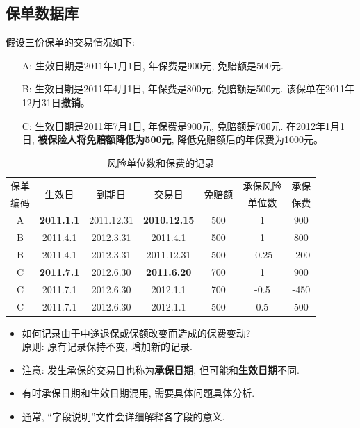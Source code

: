 \documentclass[professionalfont]{beamer}
\newcommand{\green}[1]{\textbf{#1}}
\begin{document}
\subsection{保单数据库}
\begin{frame}
	假设三份保单的交易情况如下:
\begin{enumerate}
	\item[A:]生效日期是2011年1月1日, 年保费是900元, 免赔额是500元.
	\item[B:]生效日期是2011年4月1日, 年保费是800元, 免赔额是500元. 该保单在2011年12月31日\green{撤销}。
	\item[C:]生效日期是2011年7月1日, 年保费是900元, 免赔额是700元. 在2012年1月1日, \green{被保险人将免赔额降低为500元}, 降低免赔额后的年保费为1000元。
\end{enumerate}
{\scriptsize \begin{table}[]
	\centering
	\caption{风险单位数和保费的记录}
	\label{my-label}
	\begin{tabular}{ccccccc}
		\hline
		保单 & \multirow{2}{*}{生效日} & \multirow{2}{*}{到期日} & \multirow{2}{*}{交易日} & \multirow{2}{*}{免赔额} & 承保风险  & 承保   \\
		编码 &                      &                      &                      &                      & 单位数   & 保费   \\ \hline
		A  & \green{2011.1.1}             & 2011.12.31           & \green{2010.12.15}           & 500                  & 1     & 900  \\
		B  & 2011.4.1             & 2012.3.31            & 2011.4.1             & 500                  & 1     & 800  \\
		B  & 2011.4.1             & 2012.3.31            & 2011.12.31           & 500                  & -0.25 & -200 \\
		C  & \green{2011.7.1}             & 2012.6.30            & \green{2011.6.20}            & 700                  & 1     & 900  \\
		C  & 2011.7.1             & 2012.6.30            & 2012.1.1             & 700                  & -0.5  & -450 \\
		C  & 2011.7.1             & 2012.6.30            & 2012.1.1             & 500                  & 0.5   & 500  \\ \hline
	\end{tabular}
\end{table}}
\end{frame}
\begin{frame}{}
	\begin{itemize}
		\item 如何记录由于中途退保或保额改变而造成的保费变动?\\
		原则: 原有记录保持不变, 增加新的记录.
		\item 注意: 发生承保的交易日也称为\green{承保日期}, 但可能和\green{生效日期}不同. 
		\item 有时承保日期和生效日期混用, 需要具体问题具体分析. 
		\item 通常, ``字段说明''文件会详细解释各字段的意义.
	\end{itemize}
\end{frame}
\end{document}
